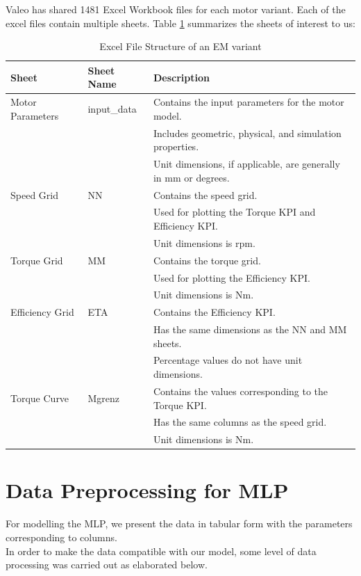\documentclass{report} %
\begin{document}
Valeo has shared 1481 Excel Workbook files for each motor variant. Each of the excel files contain multiple sheets.
Table \ref{tab:Excel File Structure} summarizes the sheets of interest to us:
\begin{table}[H]
    \centering
    \begin{tabular}{|p{3cm}|p{2.5cm}|p{10cm}|}
    \hline 
    {\bf Sheet} & {\bf Sheet Name} & {\bf Description} \\
    \hline 
    Motor Parameters & input\_data & 
    Contains the input parameters for the motor model. \\
    & & Includes geometric, physical, and simulation properties. \\
    & & Unit dimensions, if applicable, are generally in mm or degrees. \\
    Speed Grid & NN & 
    Contains the speed grid. \\
    & & Used for plotting the Torque \ac{KPI} and Efficiency \ac{KPI}. \\
    & & Unit dimensions is rpm. \\
    Torque Grid & MM & 
    Contains the torque grid. \\
    & & Used for plotting the Efficiency \ac{KPI}. \\
    & & Unit dimensions is Nm. \\
    Efficiency Grid & ETA & 
    Contains the Efficiency \ac{KPI}. \\
    & & Has the same dimensions as the NN and MM sheets. \\
    & & Percentage values do not have unit dimensions. \\
    Torque Curve & Mgrenz & 
    Contains the values corresponding to the Torque \ac{KPI}. \\
    & & Has the same columns as the speed grid. \\
    & & Unit dimensions is Nm. \\
    \hline 
    \end{tabular}
    \caption{Excel File Structure of an \ac{EM} variant}
    \label{tab:Excel File Structure}
\end{table}

\section{Data Preprocessing for \ac{MLP}}\label{sec:Data Preprocessing for MLP}

For modelling the \ac{MLP}, we present the data in tabular form with the parameters corresponding to columns. \\
In order to make the data compatible with our model, some level of data processing was carried out as elaborated below.
\end{document}
